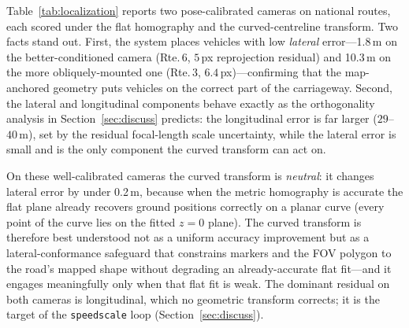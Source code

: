 \documentclass[conference]{IEEEtran}
\renewcommand{\_}{\textunderscore\allowbreak}
\begin{document}
Table~\ref{tab:localization} reports two pose-calibrated cameras on national routes,
each scored under the flat homography and the curved-centreline transform. Two facts
stand out. First, the system places vehicles with low \emph{lateral} error---1.8\,m
on the better-conditioned camera (Rte.\,6, $5$\,px reprojection residual) and 10.3\,m
on the more obliquely-mounted one (Rte.\,3, $6.4$\,px)---confirming that the
map-anchored geometry puts vehicles on the correct part of the carriageway. Second,
the lateral and longitudinal components behave exactly as the orthogonality analysis
in Section~\ref{sec:discuss} predicts: the longitudinal error is far larger
($29$--$40$\,m), set by the residual focal-length scale uncertainty, while the lateral
error is small and is the only component the curved transform can act on.

On these well-calibrated cameras the curved transform is \emph{neutral}: it changes
lateral error by under 0.2\,m, because when the metric homography is accurate the flat
plane already recovers ground positions correctly on a planar curve (every point of
the curve lies on the fitted $z{=}0$ plane). The curved transform is therefore best
understood not as a uniform accuracy improvement but as a lateral-conformance
safeguard that constrains markers and the FOV polygon to the road's mapped shape
without degrading an already-accurate flat fit---and it engages meaningfully only when
that flat fit is weak. The dominant residual on both cameras is longitudinal, which no
geometric transform corrects; it is the target of the \texttt{speed\_scale} loop
(Section~\ref{sec:discuss}).
\end{document}
